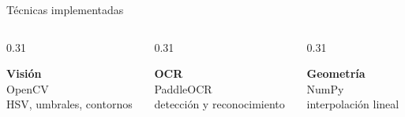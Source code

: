 ﻿\documentclass[aspectratio=169,12pt]{beamer}
\newcommand{\muted}[1]{{\color{soft}#1}}
\newcommand{\greentext}[1]{{\color{green}\textbf{#1}}}
\newcommand{\cyantext}[1]{{\color{cyan}\textbf{#1}}}
\newcommand{\yellowtext}[1]{{\color{yellow}\textbf{#1}}}
\begin{document}
\begin{frame}{Técnicas implementadas}
  \vspace{0.55cm}
  \begin{columns}[T,totalwidth=\textwidth]
    \begin{column}{0.31\textwidth}
      \begin{center}
        {\Huge\greentext{Visi\'on}}\\[0.35cm]
        {\Large OpenCV}\\[0.12cm]
        {\large\muted{HSV, umbrales, contornos}}
      \end{center}
    \end{column}

    \begin{column}{0.31\textwidth}
      \begin{center}
        {\Huge\cyantext{OCR}}\\[0.35cm]
        {\Large PaddleOCR}\\[0.12cm]
        {\large\muted{detecci\'on y reconocimiento}}
      \end{center}
    \end{column}

    \begin{column}{0.31\textwidth}
      \begin{center}
        {\Huge\yellowtext{Geometr\'ia}}\\[0.35cm]
        {\Large NumPy}\\[0.12cm]
        {\large\muted{interpolaci\'on lineal}}
      \end{center}
    \end{column}
  \end{columns}
\end{frame}
\end{document}
